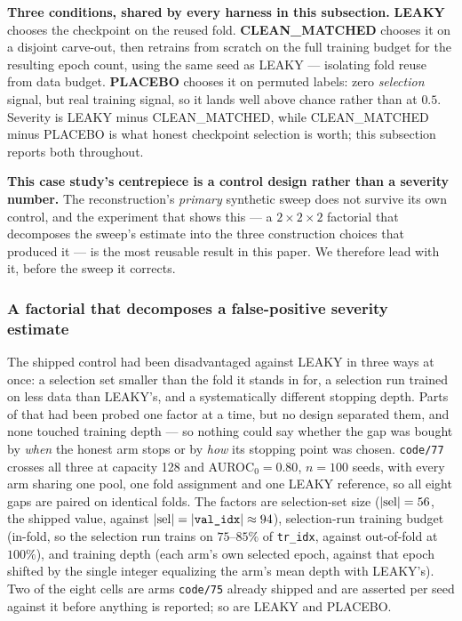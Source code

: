 \documentclass[10pt]{article} %
\begin{document}
\textbf{Three conditions, shared by every harness in this subsection.}
\textbf{LEAKY} chooses the checkpoint on the reused fold. \textbf{CLEAN\_MATCHED}
chooses it on a disjoint carve-out, then retrains from scratch on the full
training budget for the resulting epoch count, using the same seed as LEAKY ---
isolating fold reuse from data budget. \textbf{PLACEBO} chooses it on permuted
labels: zero \emph{selection} signal, but real training signal, so it lands
well above chance rather than at $0.5$. Severity is LEAKY minus CLEAN\_MATCHED,
while CLEAN\_MATCHED minus PLACEBO is what honest checkpoint selection is
worth; this subsection reports both throughout.

\textbf{This case study's centrepiece is a control design rather than a
severity number.} The reconstruction's \emph{primary} synthetic sweep does not
survive its own control, and the experiment that shows this --- a
$2\times2\times2$ factorial that decomposes the sweep's estimate into the three
construction choices that produced it --- is the most reusable result in this
paper. We therefore lead with it, before the sweep it corrects.

\subsubsection{A factorial that decomposes a false-positive severity estimate}

The shipped control had been disadvantaged against LEAKY in three ways at once:
a selection set smaller than the fold it stands in for, a selection run trained
on less data than LEAKY's, and a systematically different stopping depth. Parts
of that had been probed one factor at a time, but no design separated them, and
none touched training depth --- so nothing could say whether the gap was bought
by \emph{when} the honest arm stops or by \emph{how} its stopping point was
chosen. \texttt{code/77} crosses all three at capacity 128 and
AUROC$_0=0.80$, $n=100$ seeds, with every arm sharing one pool, one fold
assignment and one LEAKY reference, so all eight gaps are paired on identical
folds. The factors are selection-set size ($|{\rm sel}|=56$, the shipped value,
against $|{\rm sel}|=|\texttt{val\_idx}|\approx94$), selection-run training
budget (in-fold, so the selection run trains on $75$--$85\%$ of
\texttt{tr\_idx}, against out-of-fold at $100\%$), and training depth (each
arm's own selected epoch, against that epoch shifted by the single integer
equalizing the arm's mean depth with LEAKY's). Two of the eight cells are arms
\texttt{code/75} already shipped and are asserted per seed against it before
anything is reported; so are LEAKY and PLACEBO.
\end{document}
